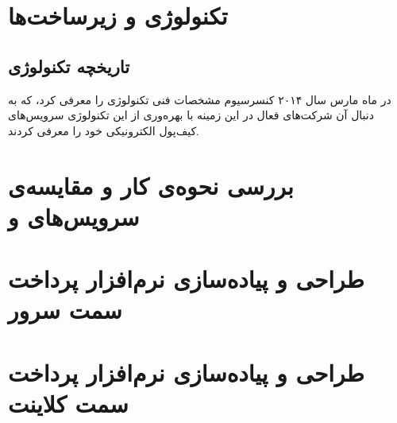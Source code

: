 \documentclass[oneside]{report}
\begin{document}
		
		
		
		
		\chapter{تکنولوژی {\Large{}} و زیرساخت‌ها }\label{tokenisation}
					\section{تاریخچه تکنولوژی{\large  {}}}
					در ماه مارس سال ۲۰۱۴ کنسرسیوم 
					{\large {}} 
					مشخصات فنی تکنولوژی 
					{\large {}} 
					را معرفی کرد، که به دنبال آن شرکت‌های فعال در این زمینه با بهره‌وری از این تکنولوژی سرویس‌های کیف‌پول الکترونیکی خود را معرفی کردند.
					
					
					
					
		\chapter{بررسی نحوه‌ی کار و مقایسه‌ی  سرویس‌های   {\Large{} }  و   {\Large{} }}\label{comparison}
		
		\chapter{طراحی و پیاده‌سازی نرم‌افزار پرداخت سمت سرور}\label{serverimplementation}
		
		\chapter{طراحی و پیاده‌سازی نرم‌افزار پرداخت سمت کلاینت}\label{clientimplementation}
		
	
	
	\newpage
	\def\bibname{مراجع}
	
	
\end{document}
